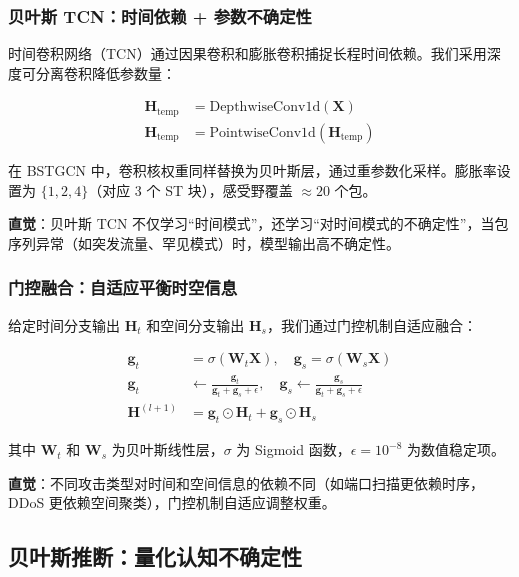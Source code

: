 \subsubsection{贝叶斯 TCN：时间依赖 + 参数不确定性}

时间卷积网络（TCN）通过因果卷积和膨胀卷积捕捉长程时间依赖。我们采用深度可分离卷积降低参数量：

\begin{align}
\mathbf{H}_{\text{temp}} &= \text{DepthwiseConv1d}(\mathbf{X}) \\
\mathbf{H}_{\text{temp}} &= \text{PointwiseConv1d}(\mathbf{H}_{\text{temp}})
\end{align}

在 BSTGCN 中，卷积核权重同样替换为贝叶斯层，通过重参数化采样。膨胀率设置为 $\{1, 2, 4\}$（对应 3 个 ST 块），感受野覆盖 $\approx 20$ 个包。

\textbf{直觉}：贝叶斯 TCN 不仅学习``时间模式''，还学习``对时间模式的不确定性''，当包序列异常（如突发流量、罕见模式）时，模型输出高不确定性。

\subsubsection{门控融合：自适应平衡时空信息}

给定时间分支输出 $\mathbf{H}_t$ 和空间分支输出 $\mathbf{H}_s$，我们通过门控机制自适应融合：

\begin{align}
\mathbf{g}_t &= \sigma(\mathbf{W}_t \mathbf{X}), \quad \mathbf{g}_s = \sigma(\mathbf{W}_s \mathbf{X}) \\
\mathbf{g}_t &\leftarrow \frac{\mathbf{g}_t}{\mathbf{g}_t + \mathbf{g}_s + \epsilon}, \quad \mathbf{g}_s \leftarrow \frac{\mathbf{g}_s}{\mathbf{g}_t + \mathbf{g}_s + \epsilon} \\
\mathbf{H}^{(l+1)} &= \mathbf{g}_t \odot \mathbf{H}_t + \mathbf{g}_s \odot \mathbf{H}_s
\end{align}

其中 $\mathbf{W}_t$ 和 $\mathbf{W}_s$ 为贝叶斯线性层，$\sigma$ 为 Sigmoid 函数，$\epsilon=10^{-8}$ 为数值稳定项。

\textbf{直觉}：不同攻击类型对时间和空间信息的依赖不同（如端口扫描更依赖时序，DDoS 更依赖空间聚类），门控机制自适应调整权重。



\subsection{贝叶斯推断：量化认知不确定性}

